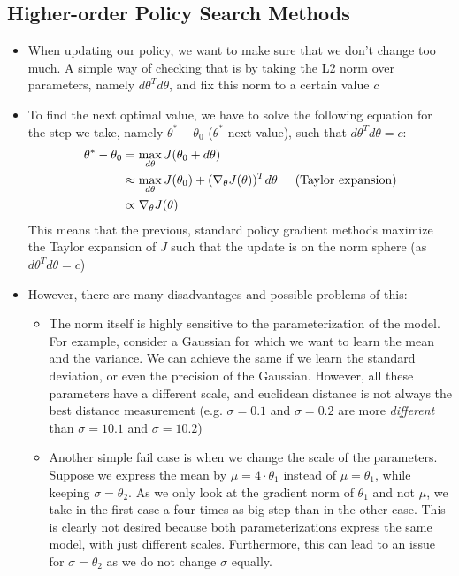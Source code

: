 \subsection{Higher-order Policy Search Methods}
\begin{itemize}
	\item When updating our policy, we want to make sure that we don't change too much. A simple way of checking that is by taking the L2 norm over parameters, namely $d\theta^T d\theta$, and fix this norm to a certain value $c$
	\item To find the next optimal value, we have to solve the following equation for the step we take, namely $\theta^{*}-\theta_0$ ($\theta^{*}$ next value), such that $d\theta^T d\theta=c$:
	\begin{equation*}
		\begin{split}
			\theta^{*}-\theta_0 & = \max_{d\theta} J(\theta_0 + d\theta)\\
			& \approx \max_{d\theta} J(\theta_0) + (\nabla_{\theta} J(\theta))^T d\theta \hspace{5mm}\text{(Taylor expansion)}\\
			& \propto \nabla_{\theta} J(\theta)
		\end{split}
	\end{equation*}
	This means that the previous, standard policy gradient methods maximize the Taylor expansion of $J$ such that the update is on the norm sphere (as $d\theta^T d\theta=c$)
	\item However, there are many disadvantages and possible problems of this:
	\begin{itemize}
		\item The norm itself is highly sensitive to the parameterization of the model. For example, consider a Gaussian for which we want to learn the mean and the variance. We can achieve the same if we learn the standard deviation, or even the precision of the Gaussian. However, all these parameters have a different scale, and euclidean distance is not always the best distance measurement (e.g. $\sigma=0.1$ and $\sigma=0.2$ are more \textit{different} than $\sigma=10.1$ and $\sigma=10.2$)
		\item Another simple fail case is when we change the scale of the parameters. Suppose we express the mean by $\mu=4\cdot \theta_1$ instead of $\mu=\theta_1$, while keeping $\sigma=\theta_2$. As we only look at the gradient norm of $\theta_1$ and not $\mu$, we take in the first case a four-times as big step than in the other case. This is clearly not desired because both parameterizations express the same model, with just different scales. Furthermore, this can lead to an issue for $\sigma=\theta_2$ as we do not change $\sigma$ equally.

\end{itemize}
\end{itemize}
